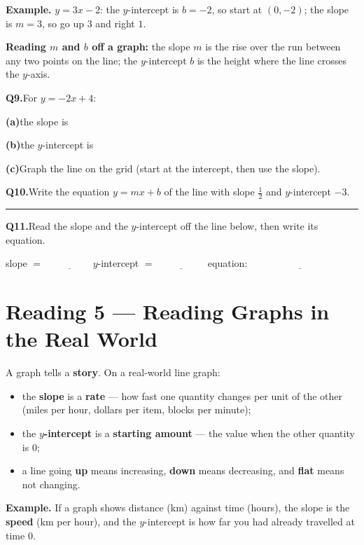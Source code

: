 \documentclass[12pt]{article}
\newcommand{\wl}{\par\vspace{5mm}\noindent\rule{\linewidth}{0.4pt}\par\vspace{1mm}}
\newcommand{\gridaxes}[1]{%
  \draw[step=1,gray!25,very thin] (-#1,-#1) grid (#1,#1);%
  \draw[thick,->] (-#1-0.4,0)--(#1+0.4,0) node[right]{$x$};%
  \draw[thick,->] (0,-#1-0.4)--(0,#1+0.4) node[above]{$y$};%
  \foreach \n in {-#1,...,#1}{\ifnum\n=0\else
      \draw (\n,0.08)--(\n,-0.08) node[below]{\scriptsize$\n$};
      \draw (0.08,\n)--(-0.08,\n) node[left]{\scriptsize$\n$};\fi}%
}
\begin{document}
\textbf{Example.} $y = 3x - 2$: the $y$-intercept is $b = -2$, so start at $(0,-2)$; the slope is $m = 3$, so go up
$3$ and right $1$.

\textbf{Reading $m$ and $b$ off a graph:} the slope $m$ is the rise over the run between any two points on the
line; the $y$-intercept $b$ is the height where the line crosses the $y$-axis.

\bigskip
\textbf{Q9.}\quad For $y = -2x + 4$:

\medskip
\textbf{(a)}\quad the slope is \hfill \underline{\hspace{3cm}}

\medskip
\textbf{(b)}\quad the $y$-intercept is \hfill \underline{\hspace{3cm}}

\medskip
\textbf{(c)}\quad Graph the line on the grid (start at the intercept, then use the slope).

\begin{center}
\end{center}

\textbf{Q10.}\quad Write the equation $y = mx + b$ of the line with slope $\tfrac{1}{2}$ and $y$-intercept $-3$.
\wl

\textbf{Q11.}\quad Read the slope and the $y$-intercept off the line below, then write its equation.

\begin{center}
\end{center}
slope $=\;\underline{\hspace{2cm}}$\qquad $y$-intercept $=\;\underline{\hspace{2cm}}$\qquad
equation: $\;\underline{\hspace{4cm}}$

\newpage
\section*{Reading 5 --- Reading Graphs in the Real World}
A graph tells a \textbf{story}. On a real-world line graph:
\begin{itemize}
  \item the \textbf{slope} is a \textbf{rate} --- how fast one quantity changes per unit of the other (miles per
        hour, dollars per item, blocks per minute);
  \item the \textbf{$y$-intercept} is a \textbf{starting amount} --- the value when the other quantity is $0$;
  \item a line going \textbf{up} means increasing, \textbf{down} means decreasing, and \textbf{flat} means not
        changing.
\end{itemize}
\textbf{Example.} If a graph shows distance (km) against time (hours), the slope is the \textbf{speed} (km per
hour), and the $y$-intercept is how far you had already travelled at time $0$.
\end{document}
